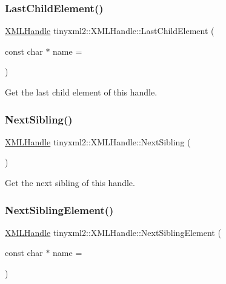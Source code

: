 \subsubsection{\texorpdfstring{Last\+Child\+Element()}{LastChildElement()}}
{\footnotesize\ttfamily \hyperlink{classtinyxml2_1_1_x_m_l_handle}{X\+M\+L\+Handle} tinyxml2\+::\+X\+M\+L\+Handle\+::\+Last\+Child\+Element (\begin{DoxyParamCaption}\item[{const char $\ast$}]{name = {} }\end{DoxyParamCaption})\hspace{0.3cm}{\ttfamily [inline]}}



Get the last child element of this handle. 

\mbox{\label{classtinyxml2_1_1_x_m_l_handle_aad2eccc7c7c7b18145877c978c3850b5}} 
\subsubsection{\texorpdfstring{Next\+Sibling()}{NextSibling()}}
{\footnotesize\ttfamily \hyperlink{classtinyxml2_1_1_x_m_l_handle}{X\+M\+L\+Handle} tinyxml2\+::\+X\+M\+L\+Handle\+::\+Next\+Sibling (\begin{DoxyParamCaption}{ }\end{DoxyParamCaption})\hspace{0.3cm}{\ttfamily [inline]}}



Get the next sibling of this handle. 

\mbox{\label{classtinyxml2_1_1_x_m_l_handle_ae41d88ee061f3c49a081630ff753b2c5}} 
\subsubsection{\texorpdfstring{Next\+Sibling\+Element()}{NextSiblingElement()}}
{\footnotesize\ttfamily \hyperlink{classtinyxml2_1_1_x_m_l_handle}{X\+M\+L\+Handle} tinyxml2\+::\+X\+M\+L\+Handle\+::\+Next\+Sibling\+Element (\begin{DoxyParamCaption}\item[{const char $\ast$}]{name = {} }\end{DoxyParamCaption})\hspace{0.3cm}{\ttfamily [inline]}}



